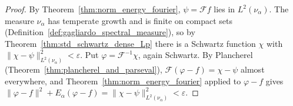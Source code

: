 \begin{proof}
\leanok
By Theorem~\ref{thm:norm_energy_fourier}, $\psi = \mathcal{F} f$ lies in $L^2(\nu_\alpha)$. The measure $\nu_\alpha$ has temperate growth and is finite on compact sets (Definition~\ref{def:gagliardo_spectral_measure}), so by Theorem~\ref{thm:std_schwartz_dense_Lp} there is a Schwartz function $\chi$ with $\lVert \chi - \psi \rVert_{L^2(\nu_\alpha)}^2 < \varepsilon$. Put $\varphi = \mathcal{F}^{-1}\chi$, again Schwartz. By Plancherel (Theorem~\ref{thm:plancherel_and_parseval}), $\mathcal{F}(\varphi - f) = \chi - \psi$ almost everywhere, and Theorem~\ref{thm:norm_energy_fourier} applied to $\varphi - f$ gives $\lVert \varphi - f \rVert^2 + E_\alpha(\varphi - f) = \lVert \chi - \psi \rVert_{L^2(\nu_\alpha)}^2 < \varepsilon$.
\end{proof}
